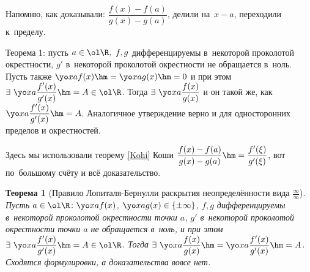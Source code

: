 \documentclass[a4paper,10pt,twoside]{article}
\newtheorem{The}{Теорема}[section]
\begin{document}
Напомню, как доказывали: $\dfrac{f(x)-f(a)}{g(x)-g(a)}$, делили на~$x-a$, переходили к~пределу.

Теорема 1: пусть $a\in\ol\R,\ f,g$ дифференцируемы в~некоторой проколотой окрестности, $g'$ в~некоторой проколотой окрестности не обращается в~ноль. Пусть
также $\yo xaf(x)\hm=\yo xag(x)\hm=0$ и при этом $\exists\  \yo xa\dfrac{f'(x)}{g'(x)}\hm={A\in\ol\R}$. Тогда $\exists\ \yo xa\dfrac{f(x)}{g(x)}$ и он такой же,
как $\yo xa\dfrac{f'(x)}{g'(x)}\hm=A$. Аналогичное утверждение верно и для односторонних пределов и окрестностей.

Здесь мы использовали теорему \ref{Kohi} Коши $\dfrac{f(x)-f(a)}{g(x)-g(a)}\hm=\dfrac{f'(\xi)}{g'(\xi)}$, вот по~большому счёту и всё доказательство.

\begin{The}[Правило Лопиталя-Бернулли раскрытия неопределённости вида
$\frac{\infty}{\infty}$]\label{Lop2}
 Пусть $a\in\ol\R\colon \yo xaf(x)$, ${\yo xag(x)\in\{\pm\infty\}}$,
  $f,g$ дифференцируемы в~некоторой проколотой окрестности точки $a$, $g'$ в~некоторой проколотой окрестности точки $a$ не обращается в~ноль,
и при этом $\exists\ \yo xa\dfrac{f'(x)}{g'(x)}\hm=A\in\ol\R$. Тогда $\exists\ \yo xa\dfrac{f(x)}{g(x)}\hm=\yo xa\dfrac{f'(x)}{g'(x)}\hm=A$. Сходятся формулировки, а
доказательства вовсе нет.

\end{The}
\end{document}
